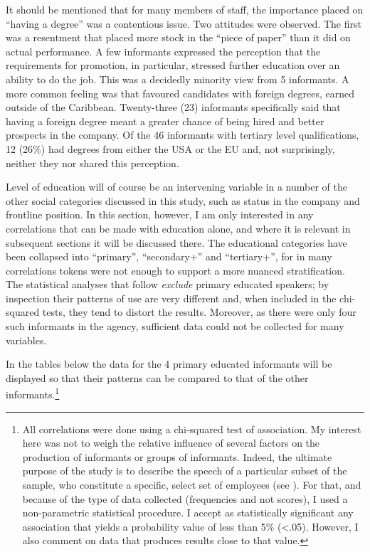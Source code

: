 It should be mentioned that for many members of staff, the importance placed on “having a degree” was a contentious issue.  Two attitudes were observed.  The first was a resentment that  placed more stock in the “piece of paper” than it did on actual performance.  A few informants expressed the perception that the requirements for promotion, in particular, stressed further education over an ability to do the job.  This was a decidedly minority view from 5 informants.  A more common feeling was that  favoured candidates with foreign degrees, earned outside of the Caribbean.  Twenty-three (23) informants specifically said that having a foreign degree meant a greater chance of being hired and better prospects in the company.  Of the 46 informants with tertiary level qualifications, 12 (26\%) had degrees from either the USA or the EU and, not surprisingly, neither they nor  shared this perception.

Level of education will of course be an intervening variable in a number of the other social categories discussed in this study, such as status in the company and frontline position.  In this section, however, I am only interested in any correlations that can be made with education alone, and where it is relevant in subsequent sections it will be discussed there.  The educational categories have been collapsed into “primary”, “secondary+” and “tertiary+”, for in many correlations tokens were not enough to support a more nuanced stratification.  The statistical analyses that follow \textit{exclude} primary educated speakers; by inspection their patterns of use are very different and, when included in the chi-squared tests, they tend to distort the results.  Moreover, as there were only four such informants in the agency, sufficient data could not be collected for many variables.

  In the tables below the data for the 4 primary educated informants will be displayed so that their patterns can be compared to that of the other informants.\footnote{All correlations were done using a chi-squared test of association.  My interest here was not to weigh the relative influence of several factors on the production of informants or groups of informants.  Indeed, the ultimate purpose of the study is to describe the speech of a particular subset of the  sample, who constitute a specific, select set of employees (see ).  For that, and because of the type of data collected (frequencies and not scores), I used a non-parametric statistical procedure.  I accept as statistically significant any association that yields a probability value of less than 5\% (<.05).  However, I also comment on data that produces results close to that value.}

